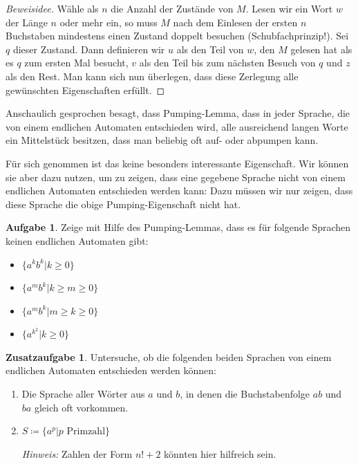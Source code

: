 \documentclass[a4paper,ngerman,12pt]{scrartcl}
\theoremstyle{definition}
\newtheorem{aufg}{Aufgabe}
\newtheorem{zaufg}{Zusatzaufgabe}
\theoremstyle{plain}
\theoremstyle{remark}
\begin{document}
\begin{proof}[Beweisidee]
	Wähle als $n$ die Anzahl der Zustände von $M$. Lesen wir ein Wort $w$ der Länge $n$ oder mehr ein, so muss $M$ nach dem Einlesen der ersten $n$ Buchstaben mindestens einen Zustand doppelt besuchen (Schubfachprinzip!). Sei $q$ dieser Zustand. Dann definieren wir $u$ als den Teil von $w$, den $M$ gelesen hat als es $q$ zum ersten Mal besucht, $v$ als den Teil bis zum nächsten Besuch von $q$ und $z$ als den Rest. Man kann sich nun überlegen, dass diese Zerlegung alle gewünschten Eigenschaften erfüllt.
\end{proof}

Anschaulich gesprochen besagt, dass Pumping-Lemma, dass in jeder Sprache, die von einem endlichen Automaten entschieden wird, alle ausreichend langen Worte ein Mittelstück besitzen, dass man beliebig oft auf- oder abpumpen kann.

Für sich genommen ist das keine besonders interessante Eigenschaft. Wir können sie aber dazu nutzen, um zu zeigen, dass eine gegebene Sprache nicht von einem endlichen Automaten entschieden werden kann: Dazu müssen wir nur zeigen, dass diese Sprache die obige Pumping-Eigenschaft nicht hat.

\begin{aufg}
	Zeige mit Hilfe des Pumping-Lemmas, dass es für folgende Sprachen keinen endlichen Automaten gibt:
	\begin{itemize}
		\item $\{a^kb^k | k \geq 0 \}$
		\item $\{a^mb^k | k \geq m \geq 0 \}$
		\item $\{a^mb^k | m \geq k \geq 0 \}$
		\item $\{a^{k^2} | k \geq 0 \}$
	\end{itemize}
\end{aufg}

\begin{zaufg}
	Untersuche, ob die folgenden beiden Sprachen von einem endlichen Automaten entschieden werden können:
	\begin{enumerate}[label=\alph*)]
		\item Die Sprache aller Wörter aus $a$ und $b$, in denen die Buchstabenfolge $ab$ und $ba$ gleich oft vorkommen.
		\item $S \coloneqq \{a^p | p \text{ Primzahl}\}$
		
		\textit{Hinweis:} Zahlen der Form $n!+2$ könnten hier hilfreich sein.		
	\end{enumerate}
\end{zaufg}
\end{document}
